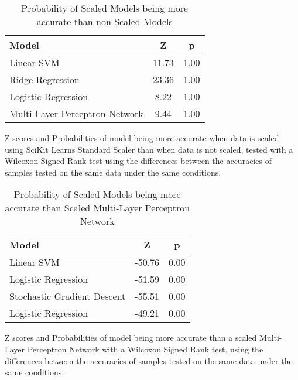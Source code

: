 \begin{table}[H]
    \begin{center}
        \begin{tabular}{l|S|S}
            \textbf{Model} & \textbf{Z} & \textbf{p}\\
            \hline
            Linear SVM & 11.73 & 1.00\\
            Ridge Regression & 23.36 & 1.00\\
            Logistic Regression & 8.22 & 1.00\\
            Multi-Layer Perceptron Network & 9.44 & 1.00\\
        \end{tabular}
        \label{tab:table2}
        \caption{Probability of Scaled Models being more accurate than non-Scaled Models}
        \footnotesize{Z scores and Probabilities of model being more accurate when data is scaled using SciKit Learns
        Standard Scaler than when data is not scaled, tested with a Wilcoxon Signed Rank test using the differences
        between the accuracies of samples tested on the same data under the same conditions.}

    \end{center}
\end{table}

\begin{table}[H]
    \begin{center}
        \begin{tabular}{l|S|S}
            \textbf{Model} & \textbf{Z} & \textbf{p}\\
            \hline
            Linear SVM & -50.76 & 0.00\\
            Logistic Regression & -51.59 & 0.00\\
            Stochastic Gradient Descent & -55.51 & 0.00\\
            Logistic Regression & -49.21 & 0.00\\
        \end{tabular}
        \centering
        \label{tab:table3}
        \caption{Probability of Scaled Models being more accurate than Scaled Multi-Layer Perceptron Network}
        \footnotesize{Z scores and Probabilities of model being more accurate than a scaled Multi-Layer Perceptron
        Network with a Wilcoxon Signed Rank test, using the differences between the accuracies of samples tested on the
        same data under the same conditions.}

    \end{center}
\end{table}

